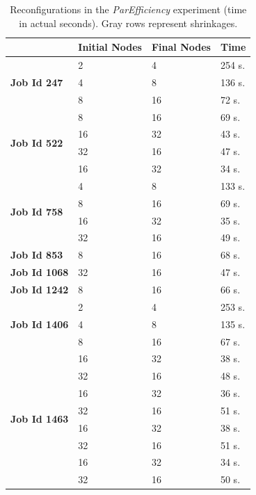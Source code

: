\documentclass[a4paper,fleqn]{cas-dc}
\begin{document}
\begin{table}
\caption{Reconfigurations in the \textit{ParEfficiency} experiment (time in actual seconds). Gray rows represent shrinkages.}
\label{tab:reconfig_pairs}
\begin{tabular}{llll}
\toprule
& \textbf{Initial Nodes} & \textbf{Final Nodes} & \textbf{Time} \\
\midrule
 \multirow{3}{*}{\textbf{Job Id 247}} 
            & 2 & 4 & 254 s. \\
            & 4 & 8 & 136 s.\\
            & 8 & 16 & 72 s.\\
\midrule
 \multirow{4}{*}{\textbf{Job Id 522}} 
            & 8 & 16 & 69 s.\\
            & 16 & 32 & 43 s.\\
            & \rowcolor{lightgray} 32 & 16 & 47 s.\\
            & 16 & 32 & 34 s.\\
\midrule
 \multirow{4}{*}{\textbf{Job Id 758}} 
            & 4 & 8 & 133 s.\\
            & 8 & 16 & 69 s.\\
            & 16 & 32 & 35 s.\\
            & \rowcolor{lightgray} 32 & 16 & 49 s.\\
\midrule
 \multirow{1}{*}{\textbf{Job Id 853}} 
            & 8 & 16 & 68 s.\\
\midrule
\multirow{1}{*}{\textbf{Job Id 1068}} 
            & \rowcolor{lightgray} 32 & 16 & 47 s.\\
\midrule
\multirow{1}{*}{\textbf{Job Id 1242}} 
            & 8 & 16 & 66 s.\\
\midrule
\multirow{3}{*}{\textbf{Job Id 1406}} 
                & 2 & 4 & 253 s.\\
                & 4 & 8 & 135 s.\\
                & 8 & 16 & 67 s.\\
\midrule
 \multirow{8}{*}{\textbf{Job Id 1463}} 
            & 16 & 32 & 38 s.\\
            & \rowcolor{lightgray} 32 & 16 & 48 s.\\
            & 16 & 32 & 36 s.\\
            & \rowcolor{lightgray} 32 & 16 & 51 s.\\
            & 16 & 32 & 38 s.\\
            & \rowcolor{lightgray} 32 & 16 & 51 s.\\
            & 16 & 32 & 34 s.\\
            & \rowcolor{lightgray} 32 & 16 & 50 s.\\        
\bottomrule
\end{tabular}
\end{table}
\end{document}
